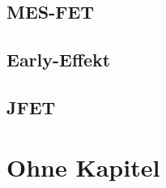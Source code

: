 \documentclass{article}
\begin{document}
\subsection{MES-FET }\label{k6:mesfet}

\subsection{Early-Effekt }\label{k6:early}

\subsection{JFET }\label{k6:jfet}

\section{Ohne Kapitel}
\end{document}
